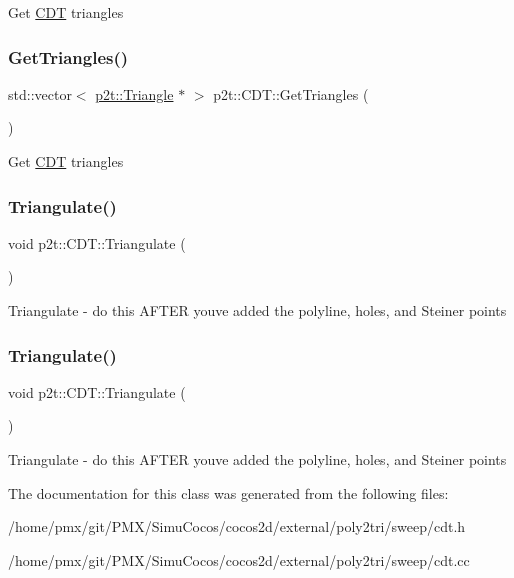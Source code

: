 Get \hyperlink{classp2t_1_1CDT}{C\+DT} triangles \mbox{\label{classp2t_1_1CDT_ac7f372972e6b94d678323d1a3378b443}} 
\subsubsection{\texorpdfstring{Get\+Triangles()}{GetTriangles()}\hspace{0.1cm}{\footnotesize\ttfamily [2/2]}}
{\footnotesize\ttfamily std\+::vector$<$ \hyperlink{classp2t_1_1Triangle}{p2t\+::\+Triangle} $\ast$ $>$ p2t\+::\+C\+D\+T\+::\+Get\+Triangles (\begin{DoxyParamCaption}{ }\end{DoxyParamCaption})}

Get \hyperlink{classp2t_1_1CDT}{C\+DT} triangles \mbox{\label{classp2t_1_1CDT_a6ba702d81df16da88e3ae80705d7d276}} 
\subsubsection{\texorpdfstring{Triangulate()}{Triangulate()}\hspace{0.1cm}{\footnotesize\ttfamily [1/2]}}
{\footnotesize\ttfamily void p2t\+::\+C\+D\+T\+::\+Triangulate (\begin{DoxyParamCaption}{ }\end{DoxyParamCaption})}

Triangulate -\/ do this A\+F\+T\+ER you\textquotesingle{}ve added the polyline, holes, and Steiner points \mbox{\label{classp2t_1_1CDT_a6ba702d81df16da88e3ae80705d7d276}} 
\subsubsection{\texorpdfstring{Triangulate()}{Triangulate()}\hspace{0.1cm}{\footnotesize\ttfamily [2/2]}}
{\footnotesize\ttfamily void p2t\+::\+C\+D\+T\+::\+Triangulate (\begin{DoxyParamCaption}{ }\end{DoxyParamCaption})}

Triangulate -\/ do this A\+F\+T\+ER you\textquotesingle{}ve added the polyline, holes, and Steiner points 

The documentation for this class was generated from the following files\+:\begin{DoxyCompactItemize}
\item 
/home/pmx/git/\+P\+M\+X/\+Simu\+Cocos/cocos2d/external/poly2tri/sweep/cdt.\+h\item 
/home/pmx/git/\+P\+M\+X/\+Simu\+Cocos/cocos2d/external/poly2tri/sweep/cdt.\+cc\end{DoxyCompactItemize}
